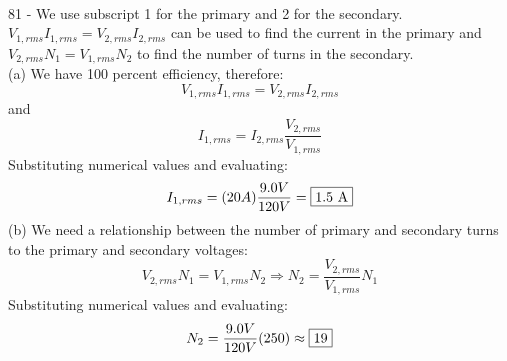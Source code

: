 \documentclass{report}
\begin{document}
\paragraph{}
81 - We use subscript 1 for the primary and 2 for the secondary. $V_{1,rms}I_{1,rms} = V_{2,rms}I_{2,rms}$ can be used to find the current in the primary and $V_{2,rms}N_1 = V_{1,rms}N_2$ to find the number of turns in the secondary.\\
(a) We have 100 percent efficiency, therefore:
$$V_{1,rms}I_{1,rms} = V_{2,rms}I_{2,rms}$$
and
$$I_{1,rms} = I_{2,rms}\frac{V_{2,rms}}{V_{1,rms}}$$
Substituting numerical values and evaluating:
$$I_{1,rms} = (20 A)\frac{9.0 V}{120 V} = \fbox{1.5 A}$$
(b) We need a relationship between the number of primary and secondary turns to the primary and secondary voltages:
$$V_{2,rms}N_1 = V_{1,rms}N_2 \Rightarrow N_2 = \frac{V_{2,rms}}{V_{1,rms}}N_1$$
Substituting numerical values and evaluating:
$$N_2 = \frac{9.0 V}{120 V}(250) \approx \fbox{19}$$
\end{document}
